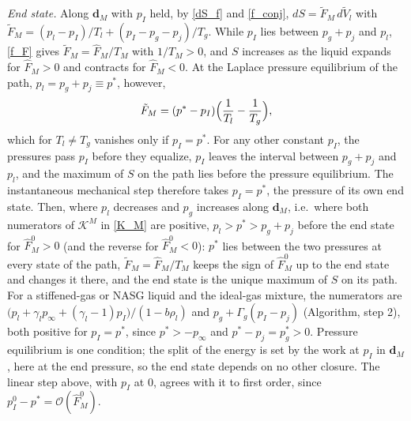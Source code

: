 \emph{End state.} Along $\boldsymbol{d}_M$ with $p_I$ held, by \eqref{dS_f} and \eqref{f_conj}, $dS=\tilde{F}_M\,d\tilde{V}_l$ with $\tilde{F}_M=(p_l-p_I)/T_l+(p_I-p_g-p_{j})/T_g$. While $p_I$ lies between $p_g+p_{j}$ and $p_l$, \eqref{f_F} gives $\tilde{F}_M=\hat{F}_M/T_M$ with $1/T_M>0$, and $S$ increases as the liquid expands for $\hat{F}_M>0$ and contracts for $\hat{F}_M<0$. At the Laplace pressure equilibrium of the path, $p_l=p_g+p_{j}\equiv p^*$, however,
\begin{equation}\label{FM_end}
\tilde{F}_M=(p^*-p_I)\Bigl(\frac1{T_l}-\frac1{T_g}\Bigr),
\end{equation}
which for $T_l\neq T_g$ vanishes only if $p_I=p^*$. For any other constant $p_I$, the pressures pass $p_I$ before they equalize, $p_I$ leaves the interval between $p_g+p_{j}$ and $p_l$, and the maximum of $S$ on the path lies before the pressure equilibrium. The instantaneous mechanical step therefore takes $p_I=p^*$, the pressure of its own end state. Then, where $p_l$ decreases and $p_g$ increases along $\boldsymbol{d}_M$, i.e.\ where both numerators of $\mathcal{K}^M$ in \eqref{K_M} are positive, $p_l>p^*>p_g+p_{j}$ before the end state for $\hat{F}_M^0>0$ (and the reverse for $\hat{F}_M^0<0$): $p^*$ lies between the two pressures at every state of the path, $\tilde{F}_M=\hat{F}_M/T_M$ keeps the sign of $\hat{F}_M^0$ up to the end state and changes it there, and the end state is the unique maximum of $S$ on its path. For a stiffened-gas or NASG liquid and the ideal-gas mixture, the numerators are $\bigl(p_l+\gamma_lp_\infty+(\gamma_l-1)p_I\bigr)/(1-b\rho_l)$ and $p_g+\Gamma_g(p_I-p_{j})$ (Algorithm, step 2), both positive for $p_I=p^*$, since $p^*>-p_\infty$ and $p^*-p_{j}=p_g^*>0$. Pressure equilibrium is one condition; the split of the energy is set by the work at $p_I$ in $\boldsymbol{d}_M$, here at the end pressure, so the end state depends on no other closure. The linear step above, with $p_I$ at $0$, agrees with it to first order, since $p_I^0-p^*=\mathcal{O}(\hat{F}_M^0)$.

